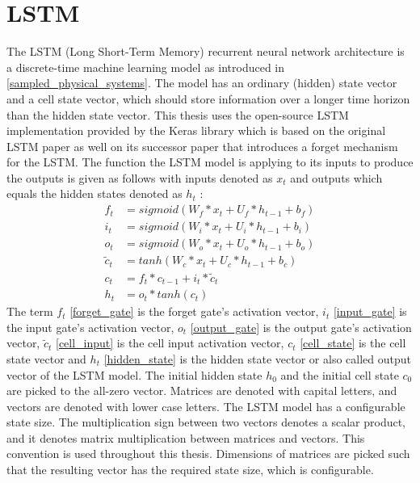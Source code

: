 \documentclass[draft,final]{vutinfth} %
\begin{document}
\section{LSTM} \label{lstm}
The LSTM (Long Short-Term Memory) recurrent neural network architecture is a discrete-time machine learning model as introduced in \ref{sampled_physical_systems}.
The model has an ordinary (hidden) state vector and a cell state vector, which should store information over a longer time horizon than the hidden state vector.
This thesis uses the open-source LSTM implementation provided by the Keras library \cite{Keras} which is based on the original LSTM paper \cite{LSTM} as well on its successor paper \cite{LSTM_forget} that introduces a forget mechanism for the LSTM.
The function the LSTM model is applying to its inputs to produce the outputs is given as follows with inputs denoted as $x_t$ and outputs which equals the hidden states denoted as $h_t$ \cite[p. 4-8]{LSTM_forget}:
\begin{align}
\label{forget_gate} f_t &= sigmoid(W_f*x_t + U_f*h_{t-1} + b_f) \\
\label{input_gate} i_t &= sigmoid(W_i*x_t + U_i*h_{t-1} + b_i) \\
\label{output_gate} o_t &= sigmoid(W_o*x_t + U_o*h_{t-1} + b_o) \\
\label{cell_input} \tilde{c}_t &= tanh(W_c*x_t + U_c*h_{t-1} + b_c) \\
\label{cell_state} c_t &= f_t * c_{t-1} + i_t * \tilde{c}_t \\
\label{hidden_state} h_t &= o_t * tanh(c_t)
\end{align}
The term $f_t$ \ref{forget_gate} is the forget gate's activation vector, $i_t$ \ref{input_gate} is the input gate's activation vector, $o_t$ \ref{output_gate} is the output gate's activation vector, $\tilde{c}_t$ \ref{cell_input} is the cell input activation vector, $c_t$ \ref{cell_state} is the cell state vector and $h_t$ \ref{hidden_state} is the hidden state vector or also called output vector of the LSTM model.
The initial hidden state $h_0$ and the initial cell state $c_0$ are picked to the all-zero vector.
Matrices are denoted with capital letters, and vectors are denoted with lower case letters.
The LSTM model has a configurable state size. The multiplication sign between two vectors denotes a scalar product, and it denotes matrix multiplication between matrices and vectors.
This convention is used throughout this thesis.
Dimensions of matrices are picked such that the resulting vector has the required state size, which is configurable.
\end{document}
